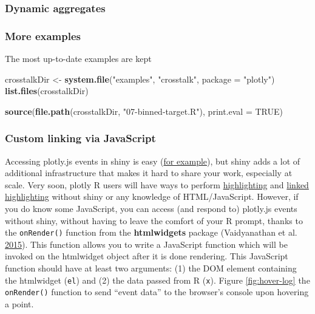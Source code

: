 \documentclass[12pt,]{isuthesis}
\newenvironment{Shaded}{\begin{snugshade}}{\end{snugshade}}
\newcommand{\KeywordTok}[1]{\textcolor[rgb]{0.13,0.29,0.53}{\textbf{{#1}}}}
\newcommand{\DataTypeTok}[1]{\textcolor[rgb]{0.13,0.29,0.53}{{#1}}}
\newcommand{\StringTok}[1]{\textcolor[rgb]{0.31,0.60,0.02}{{#1}}}
\newcommand{\OtherTok}[1]{\textcolor[rgb]{0.56,0.35,0.01}{{#1}}}
\newcommand{\NormalTok}[1]{{#1}}
\begin{document}
\hypertarget{dynamic-aggregates}{\subsubsection{Dynamic
aggregates}\label{dynamic-aggregates}}

\subsubsection{More examples}\label{more-examples}

The most up-to-date examples are kept

\begin{Shaded}
\begin{Highlighting}[]
\NormalTok{crosstalkDir <-}\StringTok{ }\KeywordTok{system.file}\NormalTok{(}\StringTok{"examples"}\NormalTok{, }\StringTok{"crosstalk"}\NormalTok{, }\DataTypeTok{package =} \StringTok{"plotly"}\NormalTok{)}
\KeywordTok{list.files}\NormalTok{(crosstalkDir)}
\end{Highlighting}
\end{Shaded}

\begin{Shaded}
\begin{Highlighting}[]
\KeywordTok{source}\NormalTok{(}\KeywordTok{file.path}\NormalTok{(crosstalkDir, }\StringTok{"07-binned-target.R"}\NormalTok{), }\DataTypeTok{print.eval =} \OtherTok{TRUE}\NormalTok{)}
\end{Highlighting}
\end{Shaded}

\subsubsection{Custom linking via
JavaScript}\label{custom-linking-via-javascript}

Accessing plotly.js events in shiny is easy
(\href{https://plot.ly/r/shiny-tutorial/}{for example}), but shiny adds
a lot of additional infrastructure that makes it hard to share your
work, especially at scale. Very soon, plotly R users will have ways to
perform
\href{https://cpsievert.github.io/plotly_book/highlighting.html}{highlighting}
and
\href{https://cpsievert.github.io/plotly_book/linked-highlighting.html}{linked
highlighting} without shiny or any knowledge of HTML/JavaScript.
However, if you do know some JavaScript, you can access (and respond to)
plotly.js events without shiny, without having to leave the comfort of
your R prompt, thanks to the \texttt{onRender()} function from the
\textbf{htmlwidgets} package (Vaidyanathan et al.
\protect\hyperlink{ref-htmlwidgets}{2015}). This function allows you to
write a JavaScript function which will be invoked on the htmlwidget
object after it is done rendering. This JavaScript function should have
at least two arguments: (1) the DOM element containing the htmlwidget
(\texttt{el}) and (2) the data passed from R (\texttt{x}). Figure
\ref{fig:hover-log} the \texttt{onRender()} function to send ``event
data'' to the browser's console upon hovering a point.
\end{document}

